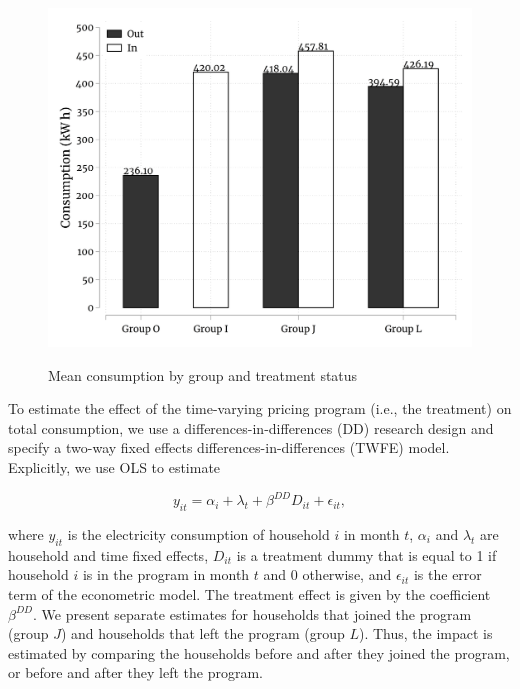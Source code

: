 \documentclass[12pt]{article}
\begin{document}
\begin{figure}[ht]
  \caption{Mean consumption by group and treatment status}\label{fig:one}
  \begin{center}
  {\includegraphics[width=1\textwidth]{./figures/meansByContractType.png}}
  \end{center}
\end{figure}

To estimate the effect of the time-varying pricing program (i.e., the treatment) on total consumption, we use a differences-in-differences (DD) research design and specify a two-way fixed effects differences-in-differences (TWFE) model. Explicitly, we use OLS to estimate

\begin{equation}
	y_{it} = \alpha_{i} + \lambda_{t} + \beta^{DD} D_{it} + \epsilon_{it},
\end{equation}

where $y_{it}$ is the electricity consumption of household $i$ in month $t$, $\alpha_{i}$ and $\lambda_{t}$ are household and time fixed effects, $D_{it}$ is a treatment dummy that is equal to 1 if household $i$ is in the program in month $t$ and 0 otherwise, and $\epsilon _{it}$ is the error term of the econometric model. The treatment effect is given by the coefficient $\beta^{DD}$. We present separate estimates for households that joined the program (group $J$) and households that left the program (group $L$). Thus, the impact is estimated by comparing the households before and after they joined the program, or before and after they left the program.
\end{document}

